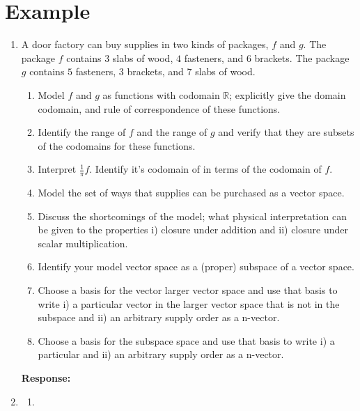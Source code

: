 \documentclass[12pt]{article}
\begin{document}
\section*{Example}
\begin{enumerate}
\item[] 
\quad A door factory can buy supplies in two kinds of packages, $f$ and $g$. 
The package $f$ contains $3$ slabs of wood, $4$ fasteners, and $6$ brackets. 
The package $g$ contains $5$ fasteners, $3$ brackets, and $7$ slabs of wood. 

\begin{enumerate}
\item Model $f$ and $g$ as functions with codomain $\mathbb{R}$;
explicitly give the domain codomain, and rule of correspondence of these functions. 

\item Identify the range of $f$ and the range of $g$ and verify that they are subsets of the codomains for these functions. 

\item Interpret $\frac1\pi f $. Identify it's codomain of in terms of the codomain of $f$. 


\item 
Model the set of ways that supplies can be purchased as a vector space. 

\item Discuss the shortcomings of the model; what physical interpretation can be given to the properties i) closure under addition and ii) closure under scalar multiplication.

\item Identify your model vector space as a (proper) subspace of a vector space.

\item
Choose a basis for the vector larger vector space and use that basis to write i) a particular vector in the larger vector space that is not in the subspace and
ii) an arbitrary supply order as a n-vector.
\item
Choose a  basis for the subspace space and use that basis to write i) a particular and ii) an arbitrary supply order as a n-vector.
\end{enumerate}

{\bfseries Response:} 
\item[]
\begin{enumerate}

\item 


\end{enumerate}
\end{enumerate}
\end{document}
